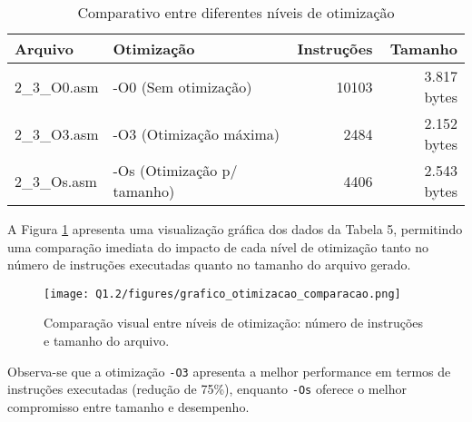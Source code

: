 \documentclass[12pt,a4paper]{article}
\begin{document}
\begin{table}[h!]
    \centering
    \small
    \begin{tabular}{|l|l|r|r|}
        \hline
        \textbf{Arquivo} & \textbf{Otimização} & \textbf{Instruções} & \textbf{Tamanho} \\
        \hline
        2\_3\_O0.asm & -O0 (Sem otimização) & 10103 & 3.817 bytes \\
        2\_3\_O3.asm & -O3 (Otimização máxima) & 2484 & 2.152 bytes \\
        2\_3\_Os.asm & -Os (Otimização p/ tamanho) & 4406 & 2.543 bytes \\
        \hline
    \end{tabular}
    \caption{Comparativo entre diferentes níveis de otimização}
\end{table}

A Figura \ref{fig:otimizacao_comparacao} apresenta uma visualização gráfica dos dados da Tabela 5, permitindo uma comparação imediata do impacto de cada nível de otimização tanto no número de instruções executadas quanto no tamanho do arquivo gerado.

\begin{figure}[H]
\centering
\texttt{[image: Q1.2/figures/grafico\_otimizacao\_comparacao.png]}
\caption{Comparação visual entre níveis de otimização: número de instruções e tamanho do arquivo.}
\label{fig:otimizacao_comparacao}
\end{figure}

Observa-se que a otimização \texttt{-O3} apresenta a melhor performance em termos de instruções executadas (redução de 75\%), enquanto \texttt{-Os} oferece o melhor compromisso entre tamanho e desempenho.
\end{document}
